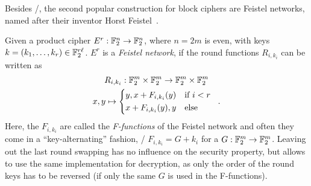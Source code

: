 Besides \SPNp/, the second popular construction for block ciphers are Feistel networks, named after their inventor Horst Feistel~\cite{USPatent:Feistel71}.
\begin{definition}
    Given a product cipher $E^r : \mathbb{F}_2^n \to \mathbb{F}_2^n$, where $n=2m$ is even, with keys $k = (k_1, \ldots, k_r) \in \mathbb{F}_2^{r\ell}$.
    $E^r$ is a \emph{Feistel network}, if the round functions $R_{i,k_i}$ can be written as
    \begin{gather*}
        R_{i,k_i} : \F_2^m \times \F_2^m \to \F_2^m \times \F_2^m \\
        x, y \mapsto \begin{cases*}
            y, x + F_{i,k_i}(y) & if $i < r$ \\
            x + F_{i,k_i}(y), y & else
        \end{cases*}\;.
    \end{gather*}
    Here, the $F_{i,k_i}$ are called the \emph{F-functions} of the Feistel network and often they come in a \enquote{key-alternating} fashion, \ie/ $F_{i,k_i} = G + k_i$ for a $G : \mathbb{F}_2^m \to \mathbb{F}_2^m$.
    Leaving out the last round swapping has no influence on the security property, but allows to use the same implementation for decryption, as only the order of the round keys has to be reversed (if only the same $G$ is used in the F-functions).
\end{definition}


